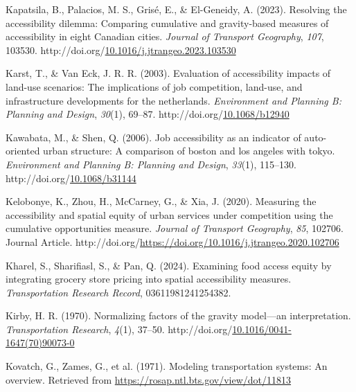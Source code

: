 \documentclass[
11pt, %
oneside, %
english, %
singlespacing, %
]{macthesis} %
\newlength{\cslhangindent}
\newenvironment{CSLReferences}[2] %
{\begin{list}{}{%
	\setlength{\itemindent}{0pt}
	\setlength{\leftmargin}{0pt}
	\setlength{\parsep}{0pt}
	\ifodd #1
	\setlength{\leftmargin}{\cslhangindent}
	\setlength{\itemindent}{-1\cslhangindent}
	\fi
	\setlength{\itemsep}{#2\baselineskip}}}
{\end{list}}
\begin{document}
\begin{CSLReferences}{1}{0}
Kapatsila, B., Palacios, M. S., Grisé, E., \& El-Geneidy, A. (2023). Resolving the accessibility dilemma: {Comparing} cumulative and gravity-based measures of accessibility in eight {Canadian} cities. \emph{Journal of Transport Geography}, \emph{107}, 103530. http://doi.org/\href{https://doi.org/10.1016/j.jtrangeo.2023.103530}{10.1016/j.jtrangeo.2023.103530}

Karst, T., \& Van Eck, J. R. R. (2003). Evaluation of accessibility impacts of land-use scenarios: The implications of job competition, land-use, and infrastructure developments for the netherlands. \emph{Environment and Planning B: Planning and Design}, \emph{30}(1), 69--87. http://doi.org/\href{https://doi.org/10.1068/b12940}{10.1068/b12940}

Kawabata, M., \& Shen, Q. (2006). Job accessibility as an indicator of auto-oriented urban structure: A comparison of boston and los angeles with tokyo. \emph{Environment and Planning B: Planning and Design}, \emph{33}(1), 115--130. http://doi.org/\href{https://doi.org/10.1068/b31144}{10.1068/b31144}

Kelobonye, K., Zhou, H., McCarney, G., \& Xia, J. (2020). Measuring the accessibility and spatial equity of urban services under competition using the cumulative opportunities measure. \emph{Journal of Transport Geography}, \emph{85}, 102706. Journal Article. http://doi.org/\url{https://doi.org/10.1016/j.jtrangeo.2020.102706}

Kharel, S., Sharifiasl, S., \& Pan, Q. (2024). Examining food access equity by integrating grocery store pricing into spatial accessibility measures. \emph{Transportation Research Record}, 03611981241254382.

Kirby, H. R. (1970). Normalizing factors of the gravity model---an interpretation. \emph{Transportation Research}, \emph{4}(1), 37--50. http://doi.org/\href{https://doi.org/10.1016/0041-1647(70)90073-0}{10.1016/0041-1647(70)90073-0}

Kovatch, G., Zames, G., et al. (1971). Modeling transportation systems: An overview. Retrieved from \url{https://rosap.ntl.bts.gov/view/dot/11813}


\end{CSLReferences}
\end{document}
